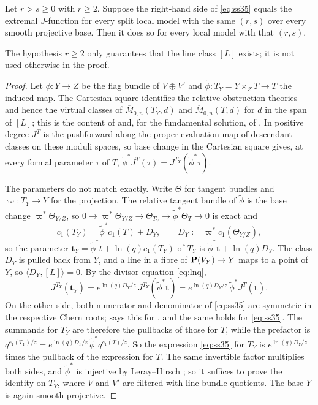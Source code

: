 \begin{lemma}
  \label{lem:split-reduction}
  Let \(r>s\ge0\) with \(r\ge2\).  Suppose the right-hand side of
  \eqref{eq:ss35} equals the extremal \(J\)-function for every split local
  model with the same \((r,s)\) over every smooth projective base.  Then it
  does so for every local model with that \((r,s)\).
\end{lemma}

The hypothesis \(r\ge2\) only guarantees that the line class \([L]\) exists;
it is not used otherwise in the proof.

\begin{proof}
  Let \(\phi\colon Y\to Z\) be the flag bundle of \(V\oplus V'\) and
  \(\tilde\phi\colon T_{Y}=Y\times_{Z}T\to T\) the induced map.  The
  Cartesian square identifies the relative obstruction theories and hence
  the virtual classes of \(\overline M_{0,n}(T_{Y},d)\) and
  \(\overline M_{0,n}(T,d)\) for \(d\) in the span of \([L]\); this is the
  content of \cite[Theorem~4.2]{SS} and, for the fundamental solution, of
  \cite[Lemma~9.5]{SS}.  In positive degree \(J^{T}\) is the pushforward
  along the proper evaluation map of descendant classes on these moduli
  spaces, so base change in the Cartesian square gives, at every formal
  parameter \(\tau\) of \(T\),
  \(\tilde\phi^{*}J^{T}(\tau)=J^{T_{Y}}(\tilde\phi^{*}\tau)\).

  The parameters do not match exactly.  Write \(\Theta\) for tangent bundles
  and \(\varpi\colon T_{Y}\to Y\) for the projection.  The relative tangent
  bundle of \(\tilde\phi\) is the base change \(\varpi^{*}\Theta_{Y/Z}\), so
  \(0\to\varpi^{*}\Theta_{Y/Z}\to\Theta_{T_{Y}}\to\tilde\phi^{*}\Theta_{T}\to0\)
  is exact and
  \[
    c_{1}(T_{Y})=\tilde\phi^{*}c_{1}(T)+D_{Y},\qquad
    D_{Y}:=\varpi^{*}c_{1}(\Theta_{Y/Z}),
  \]
  so the parameter \(\bar{\mathbf t}_{Y}=\tilde\phi^{*}t+\ln(q)c_{1}(T_{Y})\)
  of \(T_{Y}\) is \(\tilde\phi^{*}\bar{\mathbf t}+\ln(q)D_{Y}\).  The class
  \(D_{Y}\) is pulled back from \(Y\), and a line in a fibre of
  \(\mathbf P(V_{Y})\to Y\) maps to a point of \(Y\), so
  \(\langle D_{Y},[L]\rangle=0\).  By the divisor equation \eqref{eq:lnq},
  \[
    J^{T_{Y}}(\bar{\mathbf t}_{Y})
    =e^{\ln(q)D_{Y}/z}\,J^{T_{Y}}(\tilde\phi^{*}\bar{\mathbf t})
    =e^{\ln(q)D_{Y}/z}\,\tilde\phi^{*}J^{T}(\bar{\mathbf t}).
  \]
  On the other side, both numerator and denominator of \eqref{eq:ss35} are
  symmetric in the respective Chern roots; \cite[Remark~4.5(2)]{SS} says this
  for \cite[(34)]{SS}, and the same holds for \eqref{eq:ss35}.  The
  summands for \(T_{Y}\) are therefore the pullbacks of those for \(T\), while
  the prefactor is
  \(q^{c_{1}(T_{Y})/z}=e^{\ln(q)D_{Y}/z}\,\tilde\phi^{*}q^{c_{1}(T)/z}\).
  So the expression \eqref{eq:ss35} for \(T_{Y}\) is
  \(e^{\ln(q)D_{Y}/z}\) times the pullback of the expression for \(T\).  The
  same invertible factor multiplies both sides, and \(\tilde\phi^{*}\) is
  injective by Leray--Hirsch \cite[Corollary~4.3]{SS}; so it suffices to prove
  the identity on \(T_{Y}\), where \(V\) and \(V'\) are filtered with
  line-bundle quotients.  The base \(Y\) is again smooth projective.


\end{proof}
